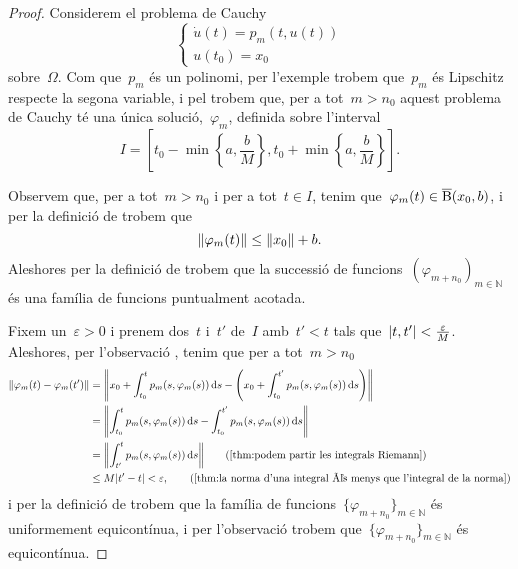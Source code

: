 \documentclass[../../main.tex]{subfiles}
\begin{document}
\begin{theorem}
\begin{proof}
            Considerem el problema de Cauchy
            \[\begin{cases}
                \displaystyle\dot{u}(t)=p_{m}(t,u(t)) \\
                \displaystyle u(t_{0})=x_{0}
            \end{cases}\] %
            sobre~\(\Omega\).
            Com que~\(p_{m}\) és un polinomi, per l'exemple  trobem que~\(p_{m}\) és Lipschitz respecte la segona variable, i pel  trobem que, per a tot~\(m>n_{0}\) aquest problema de Cauchy té una única solució,~\(\varphi_{m}\), definida sobre l'interval
            \[
                I=\left[t_{0}-\min\left\{a,\frac{b}{M}\right\},t_{0}+\min\left\{a,\frac{b}{M}\right\}\right].
            \]

            Observem que, per a tot~\(m>n_{0}\) i per a tot~\(t\in I\), tenim que~\(\varphi_{m}(t)\in\overline{\operatorname{B}}(x_{0},b)\), i per la definició de  trobem que
            \[
                \norm{\varphi_{m}(t)}\leq\norm{x_{0}}+b.
            \]
            Aleshores per la definició de  trobem que la successió de funcions~\((\varphi_{m+n_{0}})_{m\in\mathbb{N}}\) és una família de funcions puntualment acotada.

            Fixem un~\(\varepsilon>0\) i prenem dos~\(t\) i~\(t'\) de~\(I\) amb~\(t'<t\) tals que~\(\abs{t,t'}<\frac{\varepsilon}{M}\).
            Aleshores, per l'observació , tenim que per a tot~\(m>n_{0}\)
            \begin{align*}
                \norm{\varphi_{m}(t)-\varphi_{m}(t')}&=\norm{x_{0}+\int_{t_{0}}^{t}p_{m}(s,\varphi_{m}(s))\diff s-\Bigg(x_{0}+\int_{t_{0}}^{t'}p_{m}(s,\varphi_{m}(s))\diff s\Bigg)} \\
                &=\norm{\int_{t_{0}}^{t}p_{m}(s,\varphi_{m}(s))\diff s-\int_{t_{0}}^{t'}p_{m}(s,\varphi_{m}(s))\diff s} \\
                &=\norm{\int_{t'}^{t}p_{m}(s,\varphi_{m}(s))\diff s} \tag{\ref{thm:podem partir les integrals Riemann}} \\
                &\leq M\abs{t'-t}<\varepsilon, \tag{\ref{thm:la norma d'una integral és menys que l'integral de la norma}}
            \end{align*}
            i per la definició de  trobem que la família de funcions~\(\{\varphi_{m+n_{0}}\}_{m\in\mathbb{N}}\) és uniformement equicontínua, i per l'observació  trobem que~\(\{\varphi_{m+n_{0}}\}_{m\in\mathbb{N}}\) és equicontínua.


\end{proof}
\end{theorem}
\end{document}
